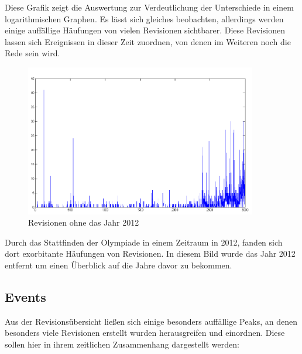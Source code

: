 \documentclass[pagesize=auto, titlepage=on]{scrartcl}
\begin{document}
Diese Grafik zeigt die Auswertung zur Verdeutlichung der Unterschiede in einem logarithmischen Graphen. Es lässt sich gleiches beobachten, allerdings werden einige auffällige Häufungen von vielen Revisionen sichtbarer. Diese Revisionen lassen sich Ereignissen in dieser Zeit zuordnen, von denen im Weiteren noch die Rede sein wird.
\clearpage
\begin{figure}[htb]
  \centering
     \includegraphics*[width=0.9\textwidth]{images/linearohne2012.png}
   \caption[Revisionen ohne 2012]{Revisionen ohne das Jahr 2012}
   \label{fig:nag_conf}
\end{figure}
Durch das Stattfinden der Olympiade in einem Zeitraum in 2012, fanden sich dort exorbitante Häufungen von Revisionen. In diesem Bild wurde das Jahr 2012 entfernt um einen Überblick auf die Jahre davor zu bekommen.
\subsection{Events}
Aus der Revisionsübersicht ließen sich einige besonders auffällige Peaks, an denen besonders viele Revisionen erstellt wurden herausgreifen und einordnen. Diese sollen hier in ihrem zeitlichen Zusammenhang dargestellt werden:
\clearpage
\end{document}
